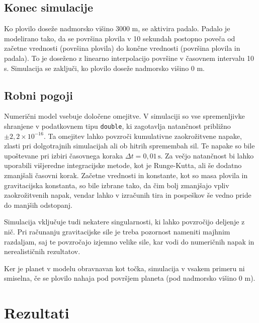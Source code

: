 \documentclass[a4paper,12pt]{article}
\begin{document}
    \subsection{Konec simulacije}
    Ko plovilo doseže nadmorsko višino 3000 m, se aktivira padalo.
    Padalo je modelirano tako, da se površina plovila v 10 sekundah postopno poveča od začetne vrednosti (površina plovila) do končne vrednosti (površina plovila in padala).
    To je doseženo z linearno interpolacijo površine v časovnem intervalu 10 s.
    Simulacija se zaključi, ko plovilo doseže nadmorsko višino 0 m.

    \subsection{Robni pogoji}
    Numerični model vsebuje določene omejitve.
    V simulaciji so vse spremenljivke shranjene v podatkovnem tipu \texttt{double}, ki zagotavlja natančnost približno \(\pm 2,2 \times 10^{-16}\).
    Ta omejitev lahko povzroči kumulativne zaokrožitvene napake, zlasti pri dolgotrajnih simulacijah ali ob hitrih spremembah sil.
    Te napake so bile upoštevane pri izbiri časovnega koraka \(\Delta t = 0,01 \, \text{s}\).
    Za večjo natančnost bi lahko uporabili višjeredne integracijske metode, kot je Runge-Kutta, ali še dodatno zmanjšali časovni korak.
    Začetne vrednosti in konstante, kot so masa plovila in gravitacijska konstanta, so bile izbrane tako, da čim bolj zmanjšajo vpliv zaokrožitvenih napak, vendar lahko v izračunih tira in pospeškov še vedno pride do manjših odstopanj.

    Simulacija vključuje tudi nekatere singularnosti, ki lahko povzročijo deljenje z nič.
    Pri računanju gravitacijske sile je treba pozornost nameniti majhnim razdaljam, saj te povzročajo izjemno velike sile, kar vodi do numeričnih napak in nerealističnih rezultatov.

    Ker je planet v modelu obravnavan kot točka, simulacija v vsakem primeru ni smiselna, če se plovilo nahaja pod površjem planeta (pod nadmorsko višino 0 m).

    \pagebreak
    \section{Rezultati}
\end{document}
